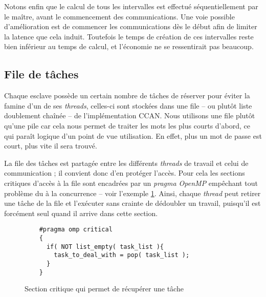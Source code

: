 Notons enfin que le calcul de tous les intervalles est effectué séquentiellement par le maître, avant le commencement des communications. Une voie possible d'amélioration est de commencer les communications dès le début afin de limiter la latence que cela induit. Toutefois le temps de création de ces intervalles reste bien inférieur au temps de calcul, et l'économie ne se ressentirait pas beaucoup.

\subsection{File de tâches}

Chaque esclave possède un certain nombre de tâches de réserver pour éviter la famine d'un de ses \emph{threads}, celles-ci sont stockées dans une file -- ou plutôt liste doublement chaînée -- de l'implémentation \textsf{CCAN}. Nous utilisons une file plutôt qu'une pile car cela nous permet de traiter les mots les plus courts d'abord, ce qui paraît logique d'un point de vue utilisation. En effet, plus un mot de passe est court, plus vite il sera trouvé. 

La file des tâches est partagée entre les différents \emph{threads} de travail et celui de communication ; il convient donc d'en protéger l'accès. Pour cela les sections critiques d'accès à la file sont encadrées par un \emph{pragma OpenMP} empêchant tout problème du à la concurrence -- voir l'exemple \ref{critical}. Ainsi, chaque \emph{thread} peut retirer une tâche de la file et l'exécuter sans crainte de dédoubler un travail, puisqu'il est forcément seul quand il arrive dans cette section. 

\begin{figure}
\begin{lstlisting}
	#pragma omp critical
	{
	  if( NOT list_empty( task_list ){
	    task_to_deal_with = pop( task_list );
	  }
	}
\end{lstlisting}
\caption{Section critique qui permet de récupérer une tâche}
\label{critical}
\end{figure}
